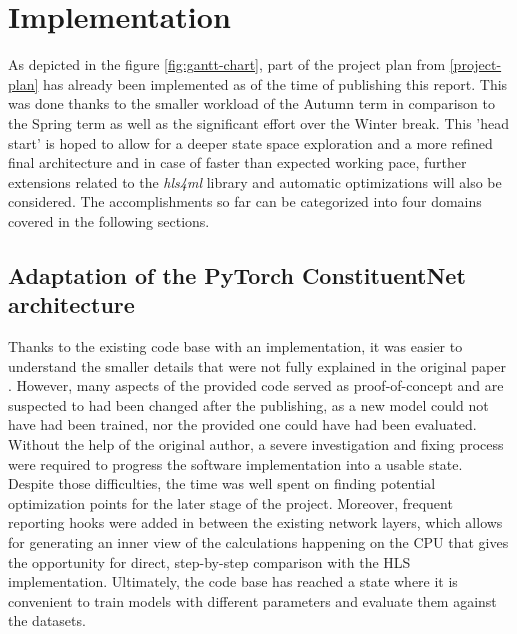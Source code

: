 \chapter{Implementation}\label{implementation}
As depicted in the figure \ref{fig:gantt-chart}, part of the project plan from \autoref{project-plan} has already been implemented as of the time of publishing this report. This was done thanks to the smaller workload of the Autumn term in comparison to the Spring term as well as the significant effort over the Winter break. This 'head start' is hoped to allow for a deeper state space exploration and a more refined final architecture and in case of faster than expected working pace, further extensions related to the \textit{hls4ml} library and automatic optimizations will also be considered. The accomplishments so far can be categorized into four domains covered in the following sections.

\section{Adaptation of the PyTorch ConstituentNet architecture}
Thanks to the existing code base with an implementation, it was easier to understand the smaller details that were not fully explained in the original paper \cite{3-yuan2021constituentnet:}. However, many aspects of the provided code served as proof-of-concept and are suspected to had been changed after the publishing, as a new model could not have had been trained, nor the provided one could have had been evaluated. Without the help of the original author, a severe investigation and fixing process were required to progress the software implementation into a usable state. Despite those difficulties, the time was well spent on finding potential optimization points for the later stage of the project. Moreover, frequent reporting hooks were added in between the existing network layers, which allows for generating an inner view of the calculations happening on the CPU that gives the opportunity for direct, step-by-step comparison with the HLS implementation. Ultimately, the code base has reached a state where it is convenient to train models with different parameters and evaluate them against the datasets.
  
